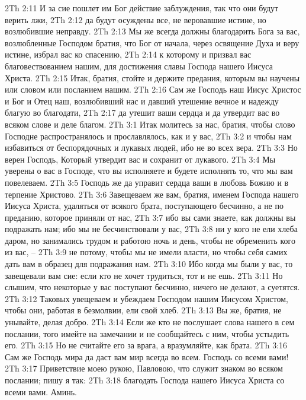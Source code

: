 2Th 2:11  И за сие пошлет им Бог действие заблуждения, так что они будут верить лжи,
2Th 2:12  да будут осуждены все, не веровавшие истине, но возлюбившие неправду.
2Th 2:13  Мы же всегда должны благодарить Бога за вас, возлюбленные Господом братия, что Бог от начала, через освящение Духа и веру истине, избрал вас ко спасению,
2Th 2:14  к которому и призвал вас благовествованием нашим, для достижения славы Господа нашего Иисуса Христа.
2Th 2:15  Итак, братия, стойте и держите предания, которым вы научены или словом или посланием нашим.
2Th 2:16  Сам же Господь наш Иисус Христос и Бог и Отец наш, возлюбивший нас и давший утешение вечное и надежду благую во благодати,
2Th 2:17  да утешит ваши сердца и да утвердит вас во всяком слове и деле благом.
2Th 3:1  Итак молитесь за нас, братия, чтобы слово Господне распространялось и прославлялось, как и у вас,
2Th 3:2  и чтобы нам избавиться от беспорядочных и лукавых людей, ибо не во всех вера.
2Th 3:3  Но верен Господь, Который утвердит вас и сохранит от лукавого.
2Th 3:4  Мы уверены о вас в Господе, что вы исполняете и будете исполнять то, что мы вам повелеваем.
2Th 3:5  Господь же да управит сердца ваши в любовь Божию и в терпение Христово.
2Th 3:6  Завещеваем же вам, братия, именем Господа нашего Иисуса Христа, удаляться от всякого брата, поступающего бесчинно, а не по преданию, которое приняли от нас,
2Th 3:7  ибо вы сами знаете, как должны вы подражать нам; ибо мы не бесчинствовали у вас,
2Th 3:8  ни у кого не ели хлеба даром, но занимались трудом и работою ночь и день, чтобы не обременить кого из вас, --
2Th 3:9  не потому, чтобы мы не имели власти, но чтобы себя самих дать вам в образец для подражания нам.
2Th 3:10  Ибо когда мы были у вас, то завещевали вам сие: если кто не хочет трудиться, тот и не ешь.
2Th 3:11  Но слышим, что некоторые у вас поступают бесчинно, ничего не делают, а суетятся.
2Th 3:12  Таковых увещеваем и убеждаем Господом нашим Иисусом Христом, чтобы они, работая в безмолвии, ели свой хлеб.
2Th 3:13  Вы же, братия, не унывайте, делая добро.
2Th 3:14  Если же кто не послушает слова нашего в сем послании, того имейте на замечании и не сообщайтесь с ним, чтобы устыдить его.
2Th 3:15  Но не считайте его за врага, а вразумляйте, как брата.
2Th 3:16  Сам же Господь мира да даст вам мир всегда во всем. Господь со всеми вами!
2Th 3:17  Приветствие моею рукою, Павловою, что служит знаком во всяком послании; пишу я так:
2Th 3:18  благодать Господа нашего Иисуса Христа со всеми вами. Аминь.


